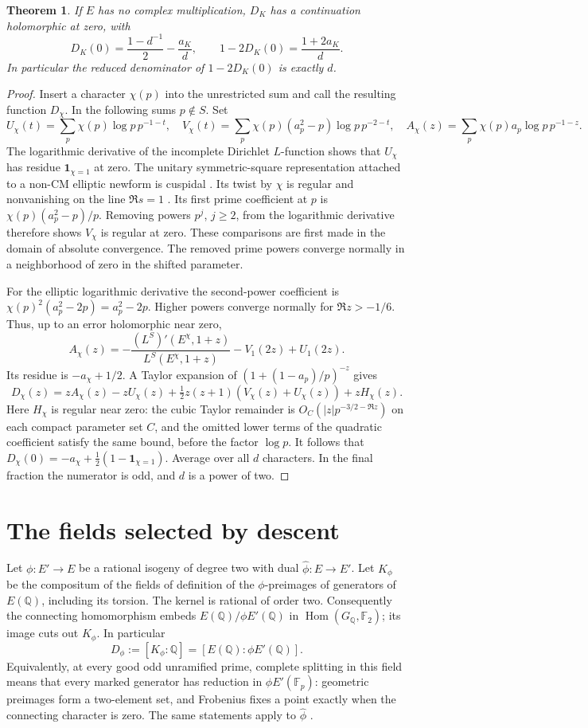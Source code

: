 \documentclass[11pt]{article}
\newtheorem{theorem}{Theorem}[section]\newtheorem{prop}[theorem]{Proposition}
\newcommand{\Q}{\mathbb Q}\newcommand{\Z}{\mathbb Z}\newcommand{\F}{\mathbb F}
\begin{document}
\begin{theorem}\label{split}
If $E$ has no complex multiplication, $D_K$ has a continuation holomorphic at zero, with
\[
 D_K(0)=\frac{1-d^{-1}}2-\frac{a_K}{d},
 \qquad 1-2D_K(0)=\frac{1+2a_K}{d}.
\]
In particular the reduced denominator of $1-2D_K(0)$ is exactly $d$.
\end{theorem}
\begin{proof}
Insert a character $\chi(p)$ into the unrestricted sum and call the resulting function $D_\chi$. In the following sums $p\notin S$. Set
\[
 U_\chi(t)=\sum_p\chi(p)\log p\,p^{-1-t},\quad
 V_\chi(t)=\sum_p\chi(p)(a_p^2-p)\log p\,p^{-2-t},\quad
 A_\chi(z)=\sum_p\chi(p)a_p\log p\,p^{-1-z}.
\]
The logarithmic derivative of the incomplete Dirichlet $L$-function shows that $U_\chi$ has residue $\mathbf1_{\chi=1}$ at zero. The unitary symmetric-square representation attached to a non-CM elliptic newform is cuspidal \cite{GJ}. Its twist by $\chi$ is regular and nonvanishing on the line $\Re s=1$ \cite{JS}. Its first prime coefficient at $p$ is $\chi(p)(a_p^2-p)/p$. Removing powers $p^j$, $j\ge2$, from the logarithmic derivative therefore shows $V_\chi$ is regular at zero. These comparisons are first made in the domain of absolute convergence. The removed prime powers converge normally in a neighborhood of zero in the shifted parameter.

For the elliptic logarithmic derivative the second-power coefficient is $\chi(p)^2(a_p^2-2p)=a_p^2-2p$. Higher powers converge normally for $\Re z>-1/6$. Thus, up to an error holomorphic near zero,
\[
 A_\chi(z)=-\frac{(L^S)'(E^\chi,1+z)}{L^S(E^\chi,1+z)}-V_1(2z)+U_1(2z).
\]
Its residue is $-a_\chi+1/2$. A Taylor expansion of $(1+(1-a_p)/p)^{-z}$ gives
\[
 D_\chi(z)=zA_\chi(z)-zU_\chi(z)
 +\tfrac12z(z+1)(V_\chi(z)+U_\chi(z))+zH_\chi(z).
\]
Here $H_\chi$ is regular near zero: the cubic Taylor remainder is $O_C(|z|p^{-3/2-\Re z})$ on each compact parameter set $C$, and the omitted lower terms of the quadratic coefficient satisfy the same bound, before the factor $\log p$. It follows that $D_\chi(0)=-a_\chi+\tfrac12(1-\mathbf1_{\chi=1})$. Average over all $d$ characters. In the final fraction the numerator is odd, and $d$ is a power of two.
\end{proof}

\section{The fields selected by descent}
Let $\phi:E'\to E$ be a rational isogeny of degree two with dual $\widehat\phi:E\to E'$. Let $K_\phi$ be the compositum of the fields of definition of the $\phi$-preimages of generators of $E(\Q)$, including its torsion. The kernel is rational of order two. Consequently the connecting homomorphism embeds $E(\Q)/\phi E'(\Q)$ in $\operatorname{Hom}(G_\Q,\F_2)$; its image cuts out $K_\phi$. In particular
\[
 D_\phi:=[K_\phi:\Q]=[E(\Q):\phi E'(\Q)].
\]
Equivalently, at every good odd unramified prime, complete splitting in this field means that every marked generator has reduction in $\phi E'(\F_p)$: geometric preimages form a two-element set, and Frobenius fixes a point exactly when the connecting character is zero. The same statements apply to $\widehat\phi$ \cite{Cremona}.
\end{document}
